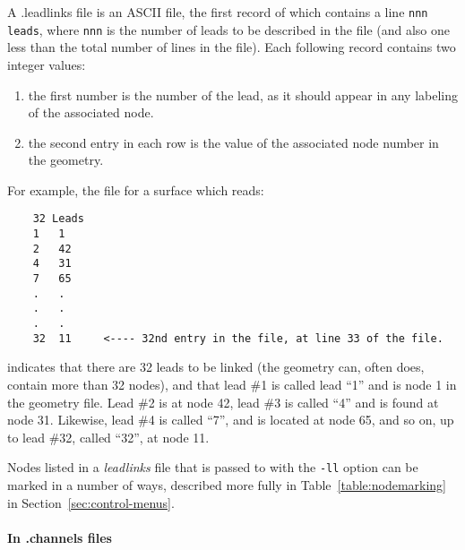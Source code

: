 A .leadlinks file is an ASCII file, the first record of which
contains a line {\tt nnn leads}, where {\tt nnn} is the number of leads to
be described in the file (and also one less than the total number of lines
in the file).  Each following record contains two integer values:\\
%
\begin{enumerate}
  \item the first number is the number of the lead, as it should appear in
        any labeling of the associated node.
  \item the second entry in each row is the value of the associated node
        number in the geometry.  
 \end{enumerate}
%
For example, the file for a surface which reads:\\
%
\begin{verbatim}
    32 Leads
    1   1   
    2   42  
    4   31  
    7   65  
    .   .   
    .   .   
    .   .   
    32  11     <---- 32nd entry in the file, at line 33 of the file.
\end{verbatim}
%
indicates that there are 32 leads to be linked (the geometry can, often
does, contain more than 32 nodes), and that lead \#1 is called lead ``1''
and is node 1 in the geometry file.  Lead \#2 is at node 42, lead \#3 is
called ``4'' and is found at node 31.  Likewise, lead \#4 is called ``7'',
and is located at node 65, and so on, up to lead \#32, called ``32'', at
node 11.

Nodes listed in a {\em leadlinks} file that is passed to \map{} with the
{\tt -ll} option can be marked in a number of ways, described more fully in
Table~\ref{table:nodemarking} in Section~\ref{sec:control-menus}.

\paragraph{In .channels files}

